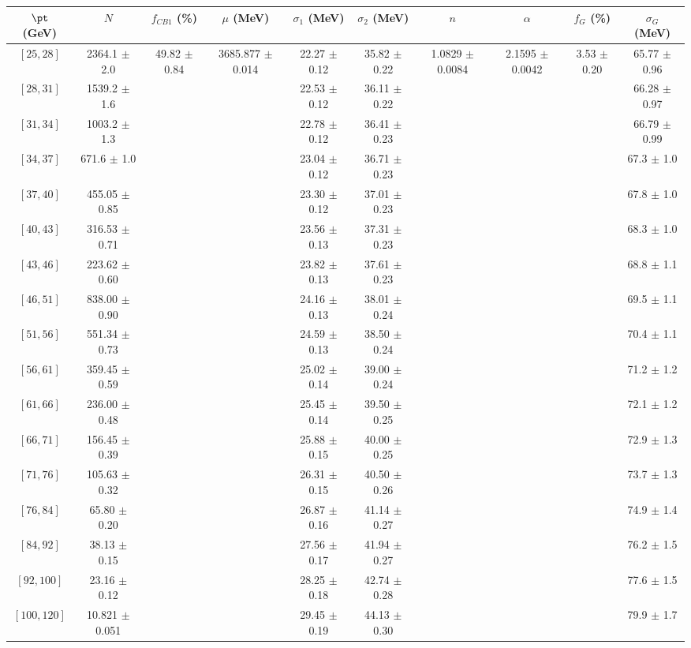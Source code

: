 \begin{tabular}{c||c|c|c|c|c|c|c|c|c}
$\pt$ (GeV) & $N$ & $f_{CB1}$ (\%)  & $\mu$ (MeV) & $\sigma_1$ (MeV) & $\sigma_2$ (MeV) & $n$ & $\alpha$ & $f_G$ (\%) & $\sigma_G$ (MeV) \\
\hline
$[25, 28]$ & 2364.1 $\pm$ 2.0 & \multirow{17}{*}{49.82 $\pm$ 0.84} & \multirow{17}{*}{3685.877 $\pm$ 0.014} & 22.27 $\pm$ 0.12 & 35.82 $\pm$ 0.22 & \multirow{17}{*}{1.0829 $\pm$ 0.0084} & \multirow{17}{*}{2.1595 $\pm$ 0.0042} & \multirow{17}{*}{3.53 $\pm$ 0.20} & 65.77 $\pm$ 0.96\\
$[28, 31]$ & 1539.2 $\pm$ 1.6 &  &  & 22.53 $\pm$ 0.12 & 36.11 $\pm$ 0.22 &  &  &  & 66.28 $\pm$ 0.97\\
$[31, 34]$ & 1003.2 $\pm$ 1.3 &  &  & 22.78 $\pm$ 0.12 & 36.41 $\pm$ 0.23 &  &  &  & 66.79 $\pm$ 0.99\\
$[34, 37]$ & 671.6 $\pm$ 1.0 &  &  & 23.04 $\pm$ 0.12 & 36.71 $\pm$ 0.23 &  &  &  & 67.3 $\pm$ 1.0\\
$[37, 40]$ & 455.05 $\pm$ 0.85 &  &  & 23.30 $\pm$ 0.12 & 37.01 $\pm$ 0.23 &  &  &  & 67.8 $\pm$ 1.0\\
$[40, 43]$ & 316.53 $\pm$ 0.71 &  &  & 23.56 $\pm$ 0.13 & 37.31 $\pm$ 0.23 &  &  &  & 68.3 $\pm$ 1.0\\
$[43, 46]$ & 223.62 $\pm$ 0.60 &  &  & 23.82 $\pm$ 0.13 & 37.61 $\pm$ 0.23 &  &  &  & 68.8 $\pm$ 1.1\\
$[46, 51]$ & 838.00 $\pm$ 0.90 &  &  & 24.16 $\pm$ 0.13 & 38.01 $\pm$ 0.24 &  &  &  & 69.5 $\pm$ 1.1\\
$[51, 56]$ & 551.34 $\pm$ 0.73 &  &  & 24.59 $\pm$ 0.13 & 38.50 $\pm$ 0.24 &  &  &  & 70.4 $\pm$ 1.1\\
$[56, 61]$ & 359.45 $\pm$ 0.59 &  &  & 25.02 $\pm$ 0.14 & 39.00 $\pm$ 0.24 &  &  &  & 71.2 $\pm$ 1.2\\
$[61, 66]$ & 236.00 $\pm$ 0.48 &  &  & 25.45 $\pm$ 0.14 & 39.50 $\pm$ 0.25 &  &  &  & 72.1 $\pm$ 1.2\\
$[66, 71]$ & 156.45 $\pm$ 0.39 &  &  & 25.88 $\pm$ 0.15 & 40.00 $\pm$ 0.25 &  &  &  & 72.9 $\pm$ 1.3\\
$[71, 76]$ & 105.63 $\pm$ 0.32 &  &  & 26.31 $\pm$ 0.15 & 40.50 $\pm$ 0.26 &  &  &  & 73.7 $\pm$ 1.3\\
$[76, 84]$ & 65.80 $\pm$ 0.20 &  &  & 26.87 $\pm$ 0.16 & 41.14 $\pm$ 0.27 &  &  &  & 74.9 $\pm$ 1.4\\
$[84, 92]$ & 38.13 $\pm$ 0.15 &  &  & 27.56 $\pm$ 0.17 & 41.94 $\pm$ 0.27 &  &  &  & 76.2 $\pm$ 1.5\\
$[92, 100]$ & 23.16 $\pm$ 0.12 &  &  & 28.25 $\pm$ 0.18 & 42.74 $\pm$ 0.28 &  &  &  & 77.6 $\pm$ 1.5\\
$[100, 120]$ & 10.821 $\pm$ 0.051 &  &  & 29.45 $\pm$ 0.19 & 44.13 $\pm$ 0.30 &  &  &  & 79.9 $\pm$ 1.7\\
\end{tabular}
